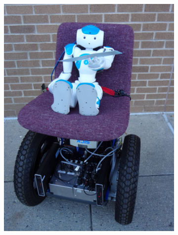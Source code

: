 
\begin{figure}[t]
	\centering
	
	\begin{subfigure}[b]{0.493\columnwidth}
	\includegraphics[width=\columnwidth]{img/mailbot_front.jpg}
	\end{subfigure}
	\hfill
	\begin{subfigure}[b]{0.493\columnwidth}

\end{subfigure}
\end{figure}
